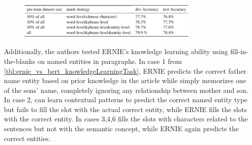 \begin{figure}[h]
\vspace{-5pt}
\centering
\includegraphics[width=0.8\textwidth]{imgs/ernie_tableAblation.png}
\vspace{-5pt}
\vspace{-5pt}
\label{tbl:ernie_ablationStudy}
\end{figure}



Additionally, the authors tested ERNIE's knowledge learning ability using fill-in-the-blanks on named entities in paragraphs. In case 1 from \cref{tbl:ernie_vs_bert_knowledgeLearningTask}, ERNIE predicts the correct father name entity based on prior knowledge in the article while  simply memorizes one of the sons' name, completely ignoring any relationship between mother and son. In case 2,  can learn contextual patterns to predict the correct named entity type but fails to fill the slot with the actual correct entity, while ERNIE fills the slots with the correct entity. In cases 3,4,6  fills the slots with characters related to the sentences but not with the semantic concept, while ERNIE again predicts the correct entities. 


